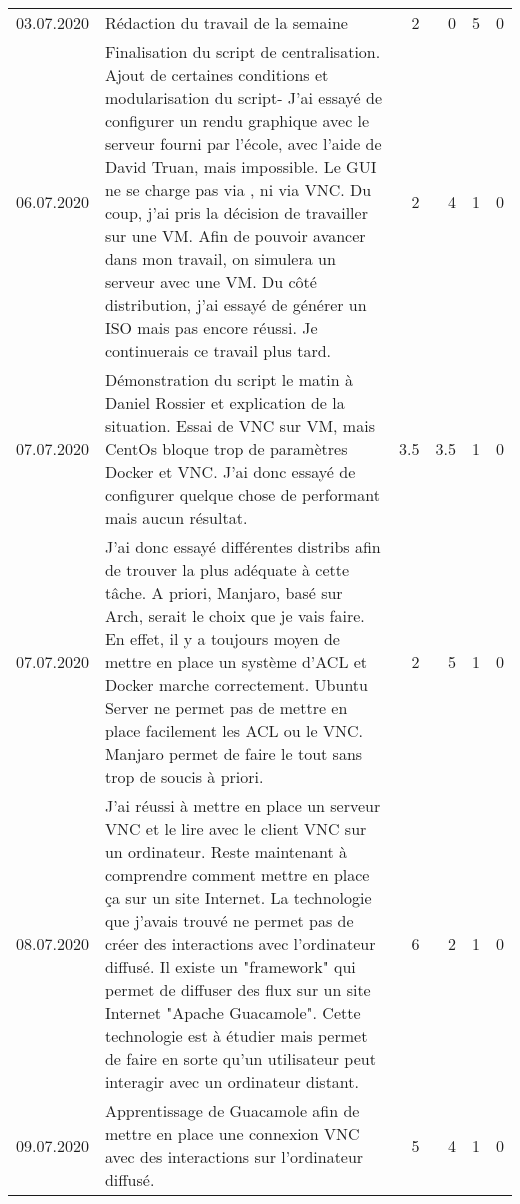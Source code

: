 \begin{landscape}
\begin{longtable}[c]{lp{10cm}rrrr}
	03.07.2020
	& Rédaction du travail de la semaine
	& 2 %
	& 0 %
	& 5 %
	& 0\\ %
	
	06.07.2020
	& Finalisation du script de centralisation. Ajout de certaines conditions et modularisation du script- J'ai essayé de configurer un rendu graphique avec le serveur fourni par l'école, avec l'aide de David Truan, mais impossible. Le GUI ne se charge pas via \com{ssh}, ni via VNC. Du coup, j'ai pris la décision de travailler sur une VM. Afin de pouvoir avancer dans mon travail, on simulera un serveur avec une VM. Du côté distribution, j'ai essayé de générer un ISO mais pas encore réussi. Je continuerais ce travail plus tard.
	& 2 %
	& 4 %
	& 1 %
	& 0\\ %
	
	07.07.2020
	& Démonstration du script le matin à Daniel Rossier et explication de la situation. Essai de VNC sur VM, mais CentOs bloque trop de paramètres Docker et VNC. J'ai donc essayé de configurer quelque chose de performant mais aucun résultat.
	& 3.5 %
	& 3.5 %
	& 1 %
	& 0\\ %
	
	07.07.2020
	& J'ai donc essayé différentes distribs afin de trouver la plus adéquate à cette tâche. A priori, Manjaro, basé sur Arch, serait le choix que je vais faire. En effet, il y a toujours moyen de mettre en place un système d'ACL et Docker marche correctement. Ubuntu Server ne permet pas de mettre en place facilement les ACL ou le VNC. Manjaro permet de faire le tout sans trop de soucis à priori. 
	& 2 %
	& 5 %
	& 1 %
	& 0\\ %
	
	08.07.2020
	& J'ai réussi à mettre en place un serveur VNC et le lire avec le client VNC sur un ordinateur. Reste maintenant à comprendre comment mettre en place ça sur un site Internet. La technologie que j'avais trouvé ne permet pas de créer des interactions avec l'ordinateur diffusé. Il existe un "framework" qui permet de diffuser des flux sur un site Internet "Apache Guacamole". Cette technologie est à étudier mais permet de faire en sorte qu'un utilisateur peut interagir avec un ordinateur distant.
	& 6 %
	& 2 %
	& 1 %
	& 0\\ %
	
	09.07.2020
	& Apprentissage de Guacamole afin de mettre en place une connexion VNC avec des interactions sur l'ordinateur diffusé.
	& 5 %
	& 4 %
	& 1 %
	& 0\\ %
	

\end{longtable}
\end{landscape}
